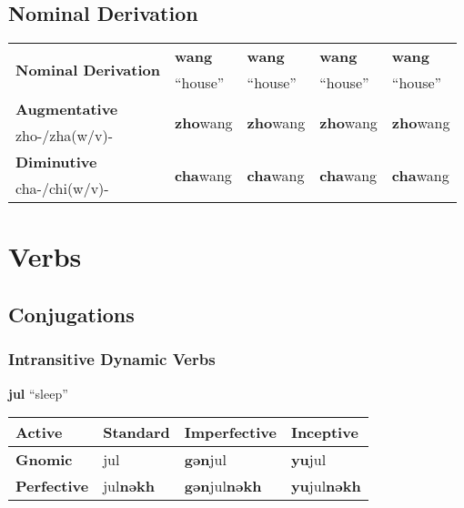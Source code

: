 \documentclass[oneside]{book}
\begin{document}
\subsection{Nominal Derivation}

\begin{center}
\begin{tabular}{|l|l|l|l|l|}\hline
\multirow{2}{*}{\textbf{Nominal Derivation}}&\textbf{wang}&\textbf{wang}&\textbf{wang}&\textbf{wang}\\
&``house''&``house''&``house''&``house''\\\hline
\textbf{Augmentative}&\multirow{2}{*}{\textbf{zho}wang}&\multirow{2}{*}{\textbf{zho}wang}&\multirow{2}{*}{\textbf{zho}wang}&\multirow{2}{*}{\textbf{zho}wang}\\\cline{1-1}
zho-/zha(w/v)-&&&&\\\hline
\textbf{Diminutive}&\multirow{2}{*}{\textbf{cha}wang}&\multirow{2}{*}{\textbf{cha}wang}&\multirow{2}{*}{\textbf{cha}wang}&\multirow{2}{*}{\textbf{cha}wang}\\\cline{1-1}
cha-/chi(w/v)-&&&&\\\hline
\end{tabular}
\end{center}

\section{Verbs}

\subsection{Conjugations}

\subsubsection{Intransitive Dynamic Verbs}

\textbf{jul} ``sleep''


\begin{center}
\begin{tabular}{|l|l|l|l|}\hline
\textbf{Active}&\textbf{Standard}&\textbf{Imperfective}&\textbf{Inceptive}\\\hline
\textbf{Gnomic}&jul&\textbf{gǝn}jul&\textbf{yu}jul\\\hline
\textbf{Perfective}&jul\textbf{nǝkh}&\textbf{gǝn}jul\textbf{nǝkh}&\textbf{yu}jul\textbf{nǝkh}\\\hline
\end{tabular}
\end{center}
\end{document}
